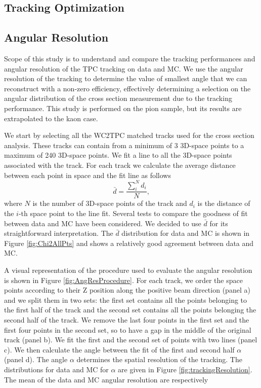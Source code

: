 \subsection{Tracking Optimization}\label{ch:TrackOptimization}


\subsection{Angular Resolution}\label{sec:angleRes}
Scope of this study is to understand and compare the tracking performances and angular resolution of the TPC tracking on data and MC. 
We use the angular resolution of the tracking to determine  the value of smallest angle that we can reconstruct with a non-zero efficiency, effectively determining a selection on the angular distribution of the cross section measurement due to the tracking performance. This study is performed on the pion sample, but its results are extrapolated to the kaon case.

We start by selecting all the WC2TPC matched tracks used for the cross section analysis.  These tracks can contain from a minimum of 3 3D-space points to a maximum of 240  3D-space points.  We fit a line to all the 3D-space points associated with the track. 
For each track we calculate the average distance between each point in space and the fit line as follows 
\begin{equation} 
\bar d = \frac{\sum^N_i d_i}{N},
\end{equation} 
where $N$ is the number of 3D-space points of the track and $d_i$ is the distance of the $i$-th space point to the line fit. Several tests to compare the goodness of fit between data and MC have been considered. We decided to use $\bar d$ for its straightforward interpretation. The $\bar d$ distribution for data and MC is shown in Figure \ref{fig:Chi2AllPts} and shows a relatively good agreement between data and MC.

A visual representation of the procedure used to evaluate the angular resolution is shown in Figure \ref{fig:AngResProcedure}. 
For each track, we order the space points according to their Z position along the positive beam direction (panel a) and we split them in two sets: the first set contains all the points belonging to the first half of the track and the second set contains all the points belonging the second half of the track. We remove the last four points in the first set and the first four points in the second set, so to have a gap in the middle of the original track (panel b). We fit the first and the second set of points with two lines  (panel c). We then calculate the angle between the fit of the first and second half $\alpha$ (panel d). The angle $\alpha$ determines the spatial resolution of the tracking. The distributions for data and MC for $\alpha$ are given in Figure \ref{fig:trackingResolution}. The mean of the data and MC angular resolution are respectively 

